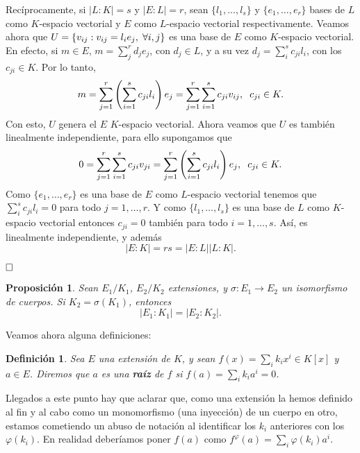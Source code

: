 \documentclass[12pt]{article}
\newtheorem{proposition}[theorem]{Proposición}
\newtheorem{definition}[theorem]{Definición}
\begin{document}
Recíprocamente, si $|L:K| = s$ y $|E:L| = r$, sean $\lbrace l_{1}, \ldots, l_{s} \rbrace$ y $\lbrace e_{1}, \ldots, e_{r} \rbrace$ bases de $L$ como $K$-espacio vectorial y $E$ como $L$-espacio vectorial respectivamente. Veamos ahora que $U= \lbrace v_{ij} : v_{ij} = l_{i}e_{j}, \hspace{0.1cm} \forall i,j \rbrace$ es una base de $E$ como $K$-espacio vectorial. En efecto, si $m \in E$, $m = \sum_{j}^{r}d_{j}e_{j}$, con $d_{j} \in L$, y a su vez $d_{j} = \sum_{i}^{s}c_{ji}l_{i}$, con los $c_{ji} \in K$. Por lo tanto, $$m = \sum_{j=1}^{r} \left(\sum_{i=1}^{s} c_{ji}l_{i}\right) e_{j} = \sum_{j=1}^{r} \sum_{i=1}^{s}c_{ji}v_{ij}, \hspace{0.2cm} c_{ji} \in K.$$ Con esto, $U$ genera el $E$ $K$-espacio vectorial. Ahora veamos que $U$ es también linealmente independiente, para ello supongamos que $$0 = \sum_{j=1}^{r} \sum_{i=1}^{s} c_{ji}v_{ji} = \sum_{j=1}^{r}\left(\sum_{i=1}^{s} c_{ji}l_{i}\right) e_{j}, \hspace{0.2cm} c_{ji} \in K.$$ Como $\lbrace e_{1}, \ldots, e_{r} \rbrace$ es una base de $E$ como $L$-espacio vectorial tenemos que $\sum_{i}^{s} c_{ji}l_{i} = 0$ para todo $j=1, \ldots, r$. Y como $\lbrace l_{1}, \ldots, l_{s} \rbrace$ es una base de $L$ como $K$-espacio vectorial entonces $c_{ji} = 0$ también para todo $i = 1, \ldots, s$. Así, es linealmente independiente, y además $$|E:K| = rs = |E:L| |L:K|.$$

$\hfill \square$

\begin{proposition}\label{eq:propprinp} Sean $E_{1}/K_{1}$, $E_{2}/K_{2}$ extensiones, y $\sigma \colon E_{1} \longrightarrow E_{2}$ un isomorfismo de cuerpos. Si $K_{2} = \sigma (K_{1})$, entonces $$|E_{1}:K_{1}| = |E_{2}:K_{2}|.$$
\end{proposition}

Veamos ahora alguna definiciones:
\begin{definition}\label{defac} Sea $E$ una extensión de $K$, y sean $f(x) = \sum_{i} k_{i}x^{i} \in K[x]$ y $a \in E$. Diremos que $a$ es una \textbf{raíz} de $f$ si $f(a) = \sum_{i} k_{i}a^{i} = 0$.
\end{definition}

Llegados  a este punto hay que aclarar que, como una extensión la hemos definido al fin y al cabo como un monomorfismo (una inyección) de un cuerpo en otro, estamos cometiendo un abuso de notación al identificar los $k_{i}$ anteriores con los $\varphi (k_{i})$. En realidad deberíamos poner $f(a)$ como $f^{\varphi} (a) = \sum_{i} \varphi(k_{i}) a^{i}$.
\end{document}
